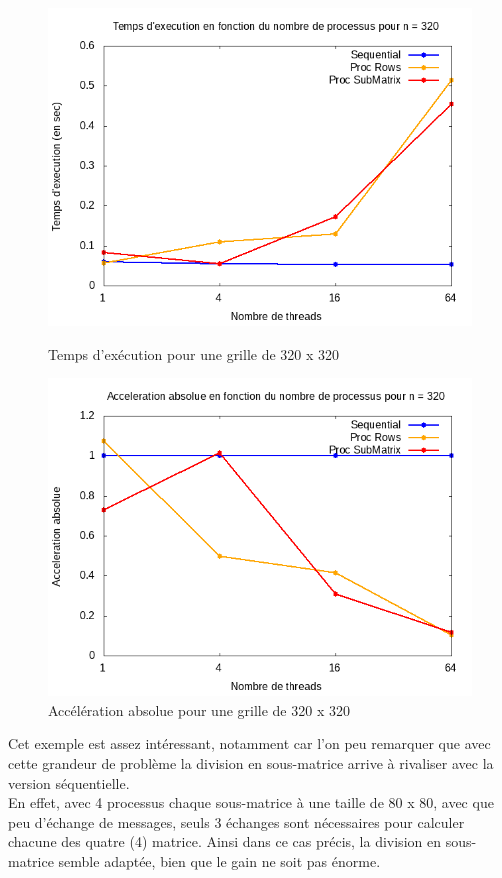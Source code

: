 \documentclass[10pt,a4paper]{article}
\begin{document}
\newpage
\begin{figure}[h]
  \centering
  \begin{minipage}[b]{0.49\textwidth}
	\includegraphics[width=\textwidth]{./Time/size_320_time.png}
    \caption{Temps d'exécution pour une grille de 320 x 320}
  \end{minipage}
  \hfill
  \begin{minipage}[b]{0.49\textwidth}
    \includegraphics[width=\textwidth]{./Time/size_320_acceleration.png}
    \caption{Accélération absolue pour une grille de 320 x 320}
  \end{minipage}
\end{figure}

Cet exemple est assez intéressant, notamment car l'on peu remarquer que avec cette grandeur de problème la division en sous-matrice arrive à rivaliser avec la version séquentielle. \\
En effet, avec 4 processus chaque sous-matrice à une taille de 80 x 80, avec que peu d'échange de messages, seuls 3 échanges sont nécessaires pour calculer chacune des quatre (4) matrice. Ainsi dans ce cas précis, la division en sous-matrice semble adaptée, bien que le gain ne soit pas énorme.\\
\end{document}
